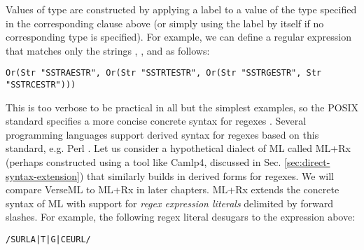 Values of type  are constructed by applying a label to a value of the type specified in the corresponding clause above (or simply using the label by itself if no corresponding type is specified). For example, we can define a regular expression that matches only the strings , ,  and  as follows:
\begin{lstlisting}[numbers=none]
Or(Str "SSTRAESTR", Or(Str "SSTRTESTR", Or(Str "SSTRGESTR", Str "SSTRCESTR")))
\end{lstlisting}

This is too verbose to be practical  in all but the simplest examples, so the POSIX standard specifies a more concise concrete syntax for regexes \cite{STD95954}. Several programming languages support derived syntax for regexes based on this standard, e.g. Perl \cite{books/daglib/0028711}. Let us consider a hypothetical dialect of ML called ML+Rx (perhaps constructed using a tool like Camlp4, discussed in Sec. \ref{sec:direct-syntax-extension}) that similarly builds in derived forms for regexes. We will compare VerseML to ML+Rx in later chapters. ML+Rx extends the concrete syntax of ML with support for \emph{regex expression literals} delimited by forward slashes. For example, the following regex literal desugars to the expression above:
\begin{lstlisting}[numbers=none]
/SURLA|T|G|CEURL/
\end{lstlisting}

